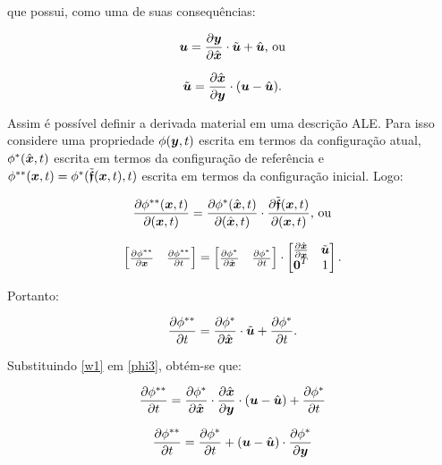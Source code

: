 \noindent que possui, como uma de suas consequências:

\begin{equation}
    \BB{u}=\der{\BB{y}}{\HBB{x}}\cdot\tilde{\BB{u}}+\uhat\text{, ou}
    \label{u1}
\end{equation}

\begin{equation}
    \tilde{\BB{u}}=\der{\HBB{x}}{\BB{y}}\cdot(\BB{u}-\uhat)\text{.}
    \label{w1}
\end{equation}

Assim é possível definir a derivada material em uma descrição ALE. Para isso considere uma propriedade $\phi(\boldsymbol{y},t)$ escrita em termos da configuração atual, $\phi^*(\hat{\boldsymbol{x}},t)$ escrita em termos da configuração de referência e $\phi^{**}(\boldsymbol{x},t)=\phi^*(\tilde{\boldsymbol{\mathfrak{f}}}(\boldsymbol{x},t),t)$ escrita em termos da configuração inicial. Logo:

\begin{equation}
    \der{\phi^{**}(\BB{x},t)}{(\BB{x},t)}=\der{\phi^*(\HBB{x},t)}{(\HBB{x},t)}\cdot\der{\tfmc(\BB{x},t)}{(\BB{x},t)}\text{, ou}
    \label{phi1}
\end{equation}

\begin{equation}
    \begin{bmatrix}\der{\phi^{**}}{\BB{x}}&\der{\phi^{**}}{t}\end{bmatrix}=
    \begin{bmatrix}\der{\phi^{*}}{\HBB{x}}&\der{\phi^{*}}{t}\end{bmatrix}\cdot
    \begin{bmatrix}\der{\HBB{x}}{\BB{x}}&\tilde{\BB{u}}\\\BB{0}^T&1\end{bmatrix}
    \text{.}
    \label{phi2}
\end{equation}

\noindent Portanto:

\begin{equation}
    \der{\phi^{**}}{t}=\der{\phi^{*}}{\HBB{x}}\cdot\tilde{\BB{u}}+\der{\phi^{*}}{t}\text{.}
    \label{phi3}
\end{equation}

Substituindo \ref{w1} em \ref{phi3}, obtém-se que:

\[\frac{\partial{\phi^{**}}}{\partial{t}}=\frac{\partial{\phi^{*}}}{\partial{\hat{\boldsymbol{x}}}}\cdot\frac{\partial{\hat{\boldsymbol{x}}}}{\partial{\boldsymbol{y}}}\cdot(\boldsymbol{u}-\hat{\boldsymbol{u}})+\frac{\partial{\phi^{*}}}{\partial{t}}\]

\[\frac{\partial{\phi^{**}}}{\partial{t}}=\frac{\partial{\phi^{*}}}{\partial{t}}+(\boldsymbol{u}-\hat{\boldsymbol{u}})\cdot\frac{\partial{\phi^{*}}}{\partial{\boldsymbol{y}}}\]


